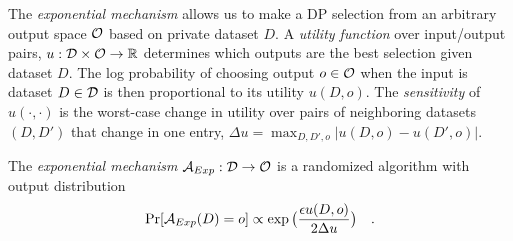 %
%
%
%
%
%
The \emph{exponential mechanism} \cite{exp_mech} allows us to make a DP selection from an arbitrary output space $\mathcal{O}$ based on private dataset $D$. A \emph{utility function} over input/output pairs, $u : \mathcal{D} \times \mathcal{O} \rightarrow {\mathbb R}$ determines which outputs are the best selection given dataset $D$. The log probability of choosing output $o \in \mathcal{O}$ when the input is dataset $D \in \mathcal{D}$ is then proportional to its utility $u(D,o)$. The \emph{sensitivity} of $u(\cdot, \cdot)$ is the worst-case change in utility over pairs of neighboring datasets $(D,D')$ that change in one entry, $\Delta u = \max_{D, D', o} | u(D,o) - u(D', o)|$. 
\begin{definition}
\label{def: exp mech} 
	The \emph{exponential mechanism} $\mathcal{A}_{Exp}: \mathcal{D} \rightarrow \mathcal{O}$ is a randomized algorithm with output distribution
	\vspace{-0.3cm}
	\begin{align*}
	\Pr[\mathcal{A}_{Exp}(D) = o] \propto \exp\big( \frac{\epsilon u(D, o)}{2 \Delta u} \big) \quad .
	\end{align*}
\end{definition}

